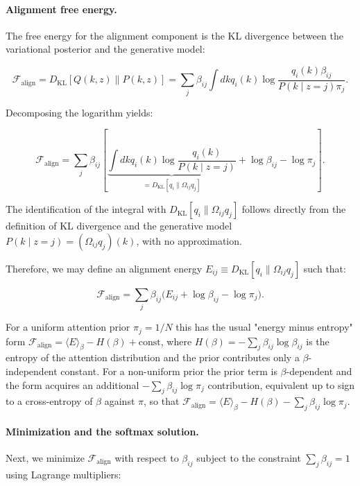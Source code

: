 \documentclass[11pt]{article}
\begin{document}
\paragraph{Alignment free energy.}
The free energy for the alignment component is the KL divergence between the variational posterior and the generative model:

\begin{equation}
\mathcal{F}_{\text{align}} = D_{\mathrm{KL}}[Q(k,z) \| P(k,z)] = \sum_j \beta_{ij} \int dk q_i(k) \log \frac{q_i(k) \beta_{ij}}{P(k \mid z{=}j) \pi_j}.
\end{equation}

Decomposing the logarithm yields:

\begin{equation}
\mathcal{F}_{\text{align}} = \sum_j \beta_{ij} \left[ \underbrace{\int dk q_i(k) \log \frac{q_i(k)}{P(k \mid z{=}j)}}_{=  D_{\mathrm{KL}}[q_i \| \Omega_{ij} q_j]} + \log \beta_{ij} - \log \pi_j \right].
\label{eq:mixture_free_energy}
\end{equation}

The identification of the integral with $D_{\mathrm{KL}}[q_i \| \Omega_{ij} q_j]$ follows directly from the definition of KL divergence and the generative model $P(k \mid z{=}j) = (\Omega_{ij} q_j)(k)$, with no approximation.

Therefore, we may define an alignment energy $E_{ij} \equiv D_{\mathrm{KL}}[q_i \| \Omega_{ij} q_j]$ such that:

\begin{equation}
\mathcal{F}_{\text{align}} = \sum_j \beta_{ij} \big( E_{ij} + \log \beta_{ij} - \log \pi_j \big).
\label{eq:mixture_energy_entropy}
\end{equation}

For a uniform attention prior $\pi_j = 1/N$ this has the usual "energy minus entropy" form $\mathcal{F}_{\text{align}} = \langle E \rangle_\beta - H(\beta) + \text{const}$, where $H(\beta) = -\sum_j \beta_{ij} \log \beta_{ij}$ is the entropy of the attention distribution and the prior contributes only a $\beta$-independent constant. For a non-uniform prior the prior term is $\beta$-dependent and the form acquires an additional $-\sum_j \beta_{ij} \log \pi_j$ contribution, equivalent up to sign to a cross-entropy of $\beta$ against $\pi$, so that $\mathcal{F}_{\text{align}} = \langle E \rangle_\beta - H(\beta) - \sum_j \beta_{ij} \log \pi_j$.

\paragraph{Minimization and the softmax solution.}
Next, we minimize $\mathcal{F}_{\text{align}}$ with respect to $\beta_{ij}$ subject to the constraint $\sum_j \beta_{ij} = 1$ using Lagrange multipliers:
\end{document}
